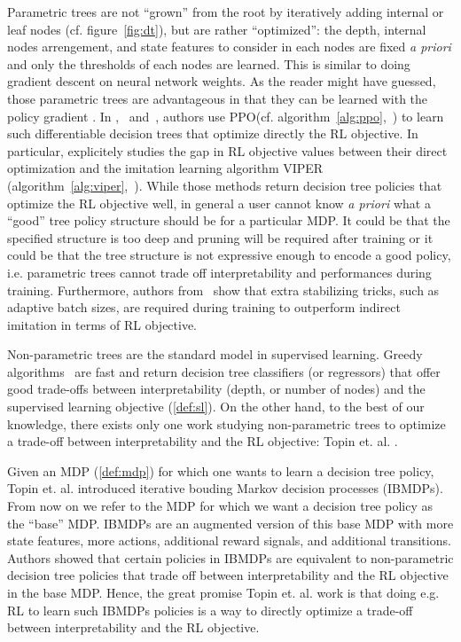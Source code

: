 Parametric trees are not ``grown'' from the root by iteratively adding internal or leaf nodes (cf. figure~\ref{fig:dt}), but are rather ``optimized'': the depth, internal nodes arrengement, and state features to consider in each nodes are fixed \textit{a priori} and only the thresholds of each nodes are learned.
This is similar to doing gradient descent on neural network weights.
As the reader might have guessed, those parametric trees are advantageous in that they can be learned with the policy gradient \cite{pg_sutton}.
In \cite{silva},~\cite{vos2024optimizinginterpretabledecisiontree} and~\cite{sympol}, authors use PPO(cf. algorithm~\ref{alg:ppo},~\cite{ppo}) to learn such differentiable decision trees that optimize directly the RL objective.
In particular, \cite{sympol} explicitely studies the gap in RL objective values between their direct optimization and the imitation learning algorithm VIPER (algorithm~\ref{alg:viper},~\cite{viper}).
While those methods return decision tree policies that optimize the RL objective well, in general a user cannot know \textit{a priori}  what a ``good'' tree policy structure should be for a particular MDP.
It could be that the specified structure is too deep and pruning will be required after training or it could be that the tree structure is not expressive enough to encode a good policy, i.e. parametric trees cannot trade off interpretability and performances during training.
Furthermore, authors from~\cite{sympol} show that extra stabilizing tricks, such as adaptive batch sizes, are required during training to outperform indirect imitation in terms of RL objective.

Non-parametric trees are the standard model in supervised learning. Greedy algorithms~\cite{breiman1984classification,ID3,c45} are fast and return decision tree classifiers (or regressors) that offer good trade-offs between interpretability (depth, or number of nodes) and the supervised learning objective (\ref{def:sl}).
On the other hand, to the best of our knowledge, there exists only one work studying non-parametric trees to optimize a trade-off between interpretability and the RL objective: Topin et. al. \cite{topin2021iterative}.

Given an MDP (\ref{def:mdp}) for which one wants to learn a decision tree policy, Topin et. al. introduced iterative bouding Markov decision processes (IBMDPs).
From now on we refer to the MDP for which we want a decision tree policy as the ``base'' MDP.
IBMDPs are an augmented version of this base MDP with more state features, more actions, additional reward signals, and additional transitions.
Authors showed that certain policies in IBMDPs are equivalent to non-parametric decision tree policies that trade off between interpretability and the RL objective in the base MDP.
Hence, the great promise Topin et. al. work is that doing e.g. RL to learn such IBMDPs policies is a way to directly optimize a trade-off between interpretability and the RL objective.

